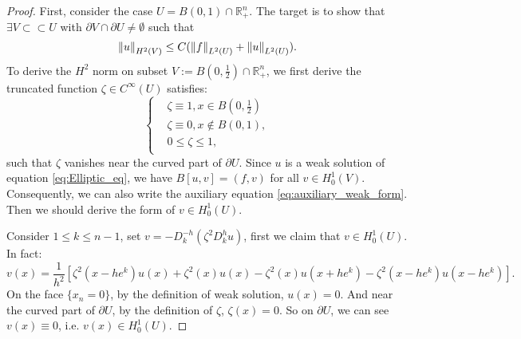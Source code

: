 \begin{proof}
    First, consider the case $U=B(0,1)\cap\mathbb{R}_{+}^{n}$. The target is to show that $\exists V\subset\subset U$ with $\partial V\cap\partial U\neq\emptyset$ such that 
    \begin{equation}
        \label{eq:estimate_ball}
        \left\|u\right\|_{H^{2}(V)}\le C(\left\|f\right\|_{L^{2}(U)}+\left\|u\right\|_{L^{2}(U)}).
    \end{equation}
    To derive the $H^{2}$ norm on subset $V:=B(0,\frac{1}{2})\cap\mathbb{R}_{+}^{n}$, we first derive the truncated function $\zeta\in C^{\infty}(U)$ satisfies:
    \begin{equation}
        \label{eq:truncated_func}
        \left\{
            \begin{aligned}
                &\zeta\equiv 1,x\in B(0,\frac{1}{2})\\
                &\zeta\equiv 0,x\notin B(0,1),\\
                &0\le\zeta\le 1,\\
            \end{aligned}
        \right.
    \end{equation}
    such that $\zeta$ vanishes near the curved part of $\partial U$. Since $u$ is a weak solution of equation \eqref{eq:Elliptic_eq}, we have $B[u,v]=(f,v)$ for all $v\in H_{0}^{1}(V)$. Consequently, we can also write the auxiliary equation \eqref{eq:auxiliary_weak_form}. Then we should derive the form of $v\in H_{0}^{1}(U)$.

    Consider $1\le k\le n-1$, set $v=-D_{k}^{-h}(\zeta^{2}D_{k}^{h}u)$, first we claim that $v\in H_{0}^{1}(U)$. In fact:
    \begin{equation}
        \label{eq:expression_for_v}
        v(x)=\frac{1}{h^2}\left[\zeta^2(x-he^{k})u(x)+\zeta^2(x)u(x)-\zeta^2(x)u(x+he^{k})-\zeta^2(x-he^{k})u(x-he^{k})\right].
    \end{equation}
    On the face $\{x_{n}=0\}$, by the definition of weak solution, $u(x)=0$. And near the curved part of $\partial U$, by the definition of $\zeta$, $\zeta(x)=0$. So on $\partial U$, we can see $v(x)\equiv 0$, i.e. $v(x)\in H_{0}^{1}(U)$.


\end{proof}
